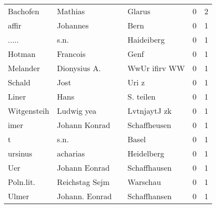 \begin{center}
\begin{tiny}
\begin{longtabu}{llllrr}
                 Bachofen &                            Mathias &             &                                      Glarus &          0 &         2 \\
                    affir &                           Johannes &             &                                        Bern &          0 &         1 \\
                    ..... &                               s.n. &             &                                  Haideiberg &          0 &         1 \\
                   Hotman &                           Francois &             &                                        Genf &          0 &         1 \\
                 Melander &                       Dionysius A. &             &                               WwUr ifirv WW &          0 &         1 \\
                   Schald &                               Jost &             &                                       Uri z &          0 &         1 \\
                    Liner &                               Hans &             &                                   S. teilen &          0 &         1 \\
              Witgensteih &                         Ludwig yea &             &                                LvtnjaytJ zk &          0 &         1 \\
                     imer &                      Johann Konrad &             &                                Schaffheusen &          0 &         1 \\
                        t &                               s.n. &             &                                       Basel &          0 &         1 \\
                  ursinus &                           acharias &             &                                  Heidelberg &          0 &         1 \\
                      Uer &                      Johann Eonrad &             &                                Schaffhausen &          0 &         1 \\
                Poln.lit. &                     Reichstag Sejm &             &                                    Warschau &          0 &         1 \\
                    Ulmer &                     Johann. Eonrad &             &                                Schaffhansen &          0 &         1 \\

\end{longtabu}
\end{tiny}
\end{center}
